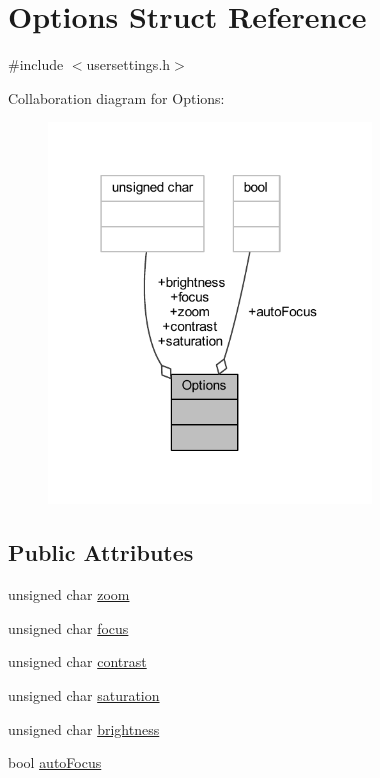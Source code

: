\hypertarget{structOptions}{}\section{Options Struct Reference}
\label{structOptions}


{\ttfamily \#include $<$usersettings.\+h$>$}



Collaboration diagram for Options\+:
\nopagebreak
\begin{figure}[H]
\begin{center}
\leavevmode
\includegraphics[width=243pt]{structOptions__coll__graph}
\end{center}
\end{figure}
\subsection*{Public Attributes}
\begin{DoxyCompactItemize}
\item 
unsigned char \mbox{\hyperlink{structOptions_adfa04ac8009b74b40fc38595bc9a2dd0}{zoom}}
\item 
unsigned char \mbox{\hyperlink{structOptions_a444d9527822f32e094907b1a8aa88d35}{focus}}
\item 
unsigned char \mbox{\hyperlink{structOptions_a983362fb0677019296772367eb16dca1}{contrast}}
\item 
unsigned char \mbox{\hyperlink{structOptions_a789c6ab9b7f014b3cae84efbf1646e83}{saturation}}
\item 
unsigned char \mbox{\hyperlink{structOptions_add944f0eb9d34b2beb6ffe7a8c7797f7}{brightness}}
\item 
bool \mbox{\hyperlink{structOptions_aab21de2c0338e19de5bf8f6f2c1e5fb6}{auto\+Focus}}
\end{DoxyCompactItemize}


